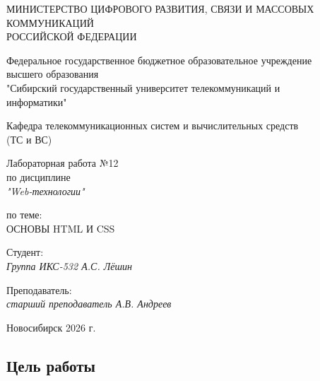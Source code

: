 \documentclass[a4paper,14pt,oneside,openany]{memoir}
\begin{document}
\thispagestyle{empty}

\begin{center}
    МИНИСТЕРСТВО ЦИФРОВОГО РАЗВИТИЯ, СВЯЗИ И МАССОВЫХ \\ КОММУНИКАЦИЙ \\ РОССИЙСКОЙ ФЕДЕРАЦИИ

    \vspace{20pt}

    Федеральное государственное бюджетное образовательное учреждение \\ высшего образования \\
    "Сибирский государственный университет телекоммуникаций и \\ информатики"

    \vspace{20pt}

    Кафедра телекоммуникационных систем и вычислительных средств \\ (ТС и ВС)
\end{center}

\vfill

\begin{center}
    Лабораторная работа №12 \\
    по дисциплине \\
    \textit{"Web-технологии"}

    \vspace{20pt}

    по теме: \\
    \uppercase{Основы HTML и CSS}
\end{center}

\vfill

\noindent Студент: \\
\textit{Группа ИКС-532 \hfill А.С. Лёшин}

\vspace{20pt}

\noindent Преподаватель: \\
\textit{старший преподаватель \hfill А.В. Андреев}

\vfill

\begin{center}
    Новосибирск 2026 г.
\end{center}

\newpage
\setcounter{page}{2}
\OnehalfSpacing*

\subsection*{Цель работы}
\end{document}
